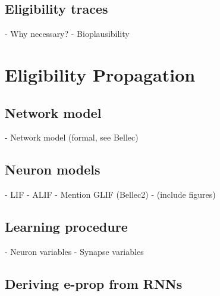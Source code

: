    \subsection{Eligibility traces}
        \begin{tcolorbox}[colback=orange]
        - Why necessary?
        - Bioplausibility

        \vspace{12cm}

        \end{tcolorbox}

\section{Eligibility Propagation}

    \subsection{Network model}
        \begin{tcolorbox}[colback=orange]
        - Network model (formal, see Bellec)

        \vspace{14cm}

        \end{tcolorbox}

    \subsection{Neuron models}
        \begin{tcolorbox}[colback=orange]
        - LIF
        - ALIF
          - Mention GLIF (Bellec2)
        - (include figures)
        \vspace{18cm}

        \end{tcolorbox}

    \subsection{Learning procedure}

        \begin{tcolorbox}[colback=orange]
        - Neuron variables
        - Synapse variables

        \vspace{20cm}

        \end{tcolorbox}

    \subsection{Deriving e-prop from RNNs}

